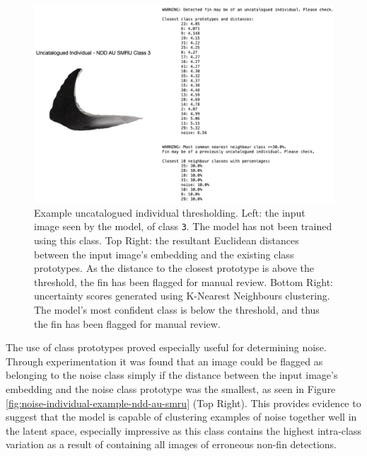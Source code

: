 \begin{figure}[t]
	\begin{center}
		\includegraphics[width=\linewidth]{Chapter6/figs/uncatalogued-individual-example-ndd-au-smru-updated.png}
	\end{center}
	\caption[Example uncatalogued individual thresholding.]{Example uncatalogued individual thresholding. Left: the input image seen by the model, of class \texttt{3}. The model has not been trained using this class. Top Right: the resultant Euclidean distances between the input image's embedding and the existing class prototypes. As the distance to the closest prototype is above the threshold, the fin has been flagged for manual review. Bottom Right: uncertainty scores generated using K-Nearest Neighbours clustering. The model's most confident class is below the threshold, and thus the fin has been flagged for manual review.}
	\label{fig:uncatalogued-individual-example-ndd-au-smru}
\end{figure}

The use of class prototypes proved especially useful for determining noise. Through experimentation it was found that an image could be flagged as belonging to the noise class simply if the distance between the input image's embedding and the noise class prototype was the smallest, as seen in Figure \ref{fig:noise-individual-example-ndd-au-smru} (Top Right). This provides evidence to suggest that the model is capable of clustering examples of noise together well in the latent space, especially impressive as this class contains the highest intra-class variation as a result of containing all images of erroneous non-fin detections.

